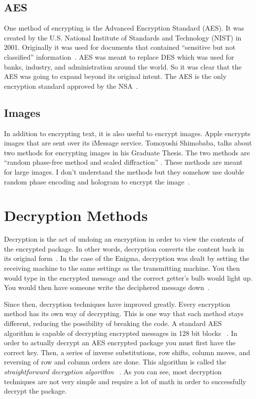 \documentclass[12pt,a4paper,titlepage]{article}
\begin{document}
\subsection{AES}
One method of encrypting is the Advanced Encryption Standard (AES)\@. It was 
created by the U.S. National Institute of Standards and Technology (NIST) in 
2001. Originally it was used for documents that contained ``sensitive but not 
classified'' information~\cite{daemen2013design}. AES was meant to replace DES 
which was used for banks, industry, and administration around the world. So it 
was clear that the AES was going to expand beyond its original intent. The AES 
is the only encryption standard approved by the NSA~\cite{daemen2013design}.

\subsection{Images}
In addition to encrypting text, it is also useful to encrypt images. Apple 
encrypts images that are sent over its iMessage service. Tomoyoshi Shimobaba, 
talks about two methods for encrypting images in his Graduate Thesis.  The two 
methods are ``random phase-free method and scaled diffraction'' 
\cite{shimobaba2015optical}. These methods are meant for large images. I don't 
understand the methods but they somehow use double random phase encoding and 
hologram to encrypt the image~\cite{shimobaba2015optical}.

\section{Decryption Methods}
Decryption is the act of undoing an encryption in order to view the contents of
the encrypted package. In other words, decryption converts the content back in
its original form~\cite{deshpande2009fpga}. In the case of the Enigma,
decryption was dealt by setting the receiving machine to the same settings as
the transmitting machine. You then would type in the encrypted message and the
correct getter's bulb would light up. You would then have someone write the
deciphered message down~\cite{wilcox2006solving}.

Since then, decryption techniques have improved greatly. Every encryption
method has its own way of decrypting. This is one way that each method stays
different, reducing the possibility of breaking the code. A standard AES
algorithm is capable of decrypting encrypted messages in 128 bit blocks
~\cite{deshpande2009fpga}. In order to actually decrypt an AES encrypted package
you must first have the correct key. Then, a series of inverse substitutions,
row shifts, column moves, and reversing of row and column orders are done. This
algorithm is called the \emph{straightforward decryption algorithm}
~\cite{daemen2013design}. As you can see, most decryption techniques are not
very simple and require a lot of math in order to successfully decrypt the
package.
\end{document}
